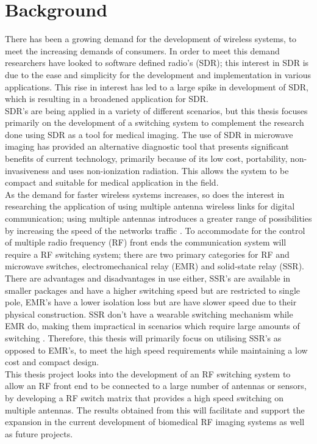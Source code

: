 \documentclass[12pt,openany,a4paper]{book}
\begin{document}
\section{Background}
\justify
There has been a growing demand for the development of wireless systems, to meet the increasing demands of consumers. In order to meet this demand researchers have looked to software defined radio's (SDR); this interest in SDR is due to the ease and simplicity for the development and implementation in various applications. This rise in interest has led to a large spike in development of SDR, which is resulting in a broadened application for SDR. \cite{ref1} \\[0.2cm]
SDR's are being applied in a variety of different scenarios, but this thesis focuses primarily on the development of a switching system to complement the research done using SDR as a tool for medical imaging. The use of SDR in microwave imaging has provided an alternative diagnostic tool that presents significant benefits of current technology, primarily because of its low cost, portability, non-invasiveness and uses non-ionization radiation. This allows the system to be compact and suitable for medical application in the field. \cite{ref2} \cite{ref3} \\[0.2cm]
As the demand for faster wireless systems increases, so does the interest in researching the application of using multiple antenna wireless links for digital communication; using multiple antennas introduces a greater range of possibilities by increasing the speed of the networks traffic \cite{ref4}. To accommodate for the control of multiple radio frequency (RF) front ends the communication system will require a RF switching system; there are two primary categories for RF and microwave switches, electromechanical relay (EMR) and solid-state relay (SSR). \\[0.2cm]
There are advantages and disadvantages in use either, SSR's are available in smaller packages and have a higher switching speed but are restricted to single pole, EMR's have a lower isolation loss but are have slower speed due to their physical construction. SSR don't have a wearable switching mechanism while EMR do, making them impractical in scenarios which require large amounts of switching \cite{ref5}. Therefore, this thesis will primarily focus on utilising SSR's as opposed to EMR's, to meet the high speed requirements while maintaining a low cost and compact design. \\[0.2cm]
This thesis project looks into the development of an RF switching system to allow an RF front end to be connected to a large number of antennas or sensors, by developing a RF switch matrix that provides a high speed switching on multiple antennas. The results obtained from this will facilitate and support the expansion in the current development of biomedical RF imaging systems as well as future projects.
\end{document}
